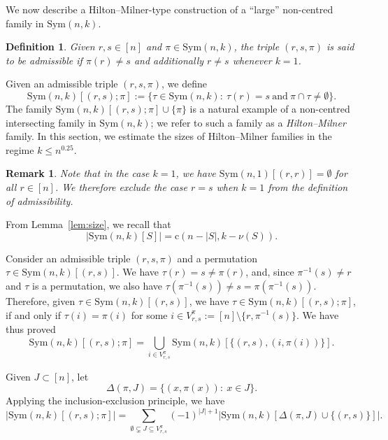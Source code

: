 \documentclass{amsart}
\newtheorem{defi}[thm]{Definition}
\newtheorem{remark}{Remark}[thm]
\newcommand{\cy}{\nu}
\newcommand{\sym}{\mathrm{Sym}}
\newcommand{\st}{\mathrm{c}}
\begin{document}
We now describe a Hilton--Milner-type construction of a ``large'' non-centred family in $\sym(n,k)$. 
\begin{defi}\label{def:admi}
Given $r,s \in [n]$ and $\pi\in \sym(n,k)$, the triple $(r,s,\pi)$ is said to be admissible if $\pi(r)\neq s$ and additionally $r\neq s$ whenever $k=1$.
\end{defi}

Given an admissible triple $(r,s,\pi)$, we define 
\begin{equation}\label{eq:HMfamily}
\sym(n,k)[(r,s);\pi]:=\{\tau \in \sym(n,k)\colon\ \tau(r)=s\ \text{and}\ \pi\cap\tau \neq \emptyset\}.
\end{equation}
The family $\sym(n,k)[(r,s);\pi] \cup\{\pi\}$ is a natural example of a non-centred intersecting family in $\sym(n,k)$; we refer to such a family as a {\it Hilton--Milner} family. 
In this section, we estimate the sizes of Hilton--Milner families in the regime $k\leq n^{0.25}$.

\begin{remark}
Note that in the case $k=1$, we have $\sym(n,1)[(r,r)]=\emptyset$ for all $r\in [n]$. We therefore exclude the case $r=s$ when $k=1$ from the definition of admissibility.
\end{remark} 

From Lemma~\ref{lem:size}, we recall that 
\begin{equation}\label{eq:size}
|\sym(n,k)[S]|= \st(n-|S|,k-\cy(S)).
\end{equation}

Consider an admissible triple $(r,s,\pi)$ and a permutation $\tau \in \sym(n,k)[(r,s)]$. We have $\tau(r)=s\neq\pi(r)$, and, since $\pi^{-1}(s)\neq r$ and $\tau$ is a permutation, we also have $\tau(\pi^{-1}(s))\neq s=\pi(\pi^{-1}(s))$. Therefore, given $\tau \in \sym(n,k)[(r,s)]$, we have $\tau \in \sym(n,k)[(r,s);\pi]$, if and only if $\tau(i)=\pi(i)$ for some $i \in V_{r,s}^{\pi}:=[n]\setminus \{r,\pi^{-1}(s)\}$.
We have thus proved \[\sym(n,k)[(r,s);\pi]= \bigcup\limits_{i\in V_{r,s}^{\pi}}\sym(n,k)[\{(r,s),(i,\pi(i))\}].\]  

Given $J \subset [n]$, let 
\begin{equation}\label{eq:deltapij}
\Delta(\pi,J)=\{(x,\pi(x))\colon\ x\in  J\}.
\end{equation}
Applying the inclusion-exclusion principle, we have
\[|\sym(n,k)[(r,s);\pi]|= \sum\limits_{\emptyset\subsetneq J \subseteq V_{r,s}^{\pi}} (-1)^{|J|+1} \left\lvert\sym(n,k)[\Delta(\pi,J) \cup \{(r,s)\}]\right\rvert.\] 
\end{document}
